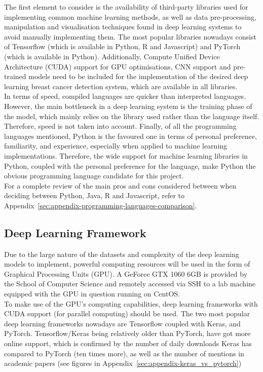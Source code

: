 The first element to consider is the availability of third-party libraries used for implementing common machine learning methods, as well as data pre-processing, manipulation and visualisation techniques found in deep learning systems to avoid manually implementing them. The most popular libraries nowadays consist of Tensorflow (which is available in Python, R and Javascript) and PyTorch (which is available in Python). Additionally, Compute Unified Device Architecture (CUDA) support for GPU optimisations, CNN support and pre-trained models need to be included for the implementation of the desired deep learning breast cancer detection system, which are available in all libraries.\\

In terms of speed, compiled languages are quicker than interpreted languages. However, the main bottleneck in a deep learning system is the training phase of the model, which mainly relies on the library used rather than the language itself. Therefore, speed is not taken into account. Finally, of all the programming languages mentioned, Python is the favoured one in terms of personal preference, familiarity, and experience, especially when applied to machine learning implementations. Therefore, the wide support for machine learning libraries in Python, coupled with the personal preference for the language, make Python the obvious programming language candidate for this project.\\

For a complete review of the main pros and cons considered between when deciding between Python, Java, R and Javascript, refer to Appendix~\ref{sec:appendix-programming-languages-comparison}.

\subsection{Deep Learning Framework}

Due to the large nature of the datasets and complexity of the deep learning models to implement, powerful computing resources will be used in the form of Graphical Processing Units (GPU). A GeForce GTX 1060 6GB is provided by the School of Computer Science and remotely accessed via SSH to a lab machine equipped with the GPU in question running on CentOS.\\

To make use of the GPU's computing capabilities, deep learning frameworks with CUDA support (for parallel computing) should be used. The two most popular deep learning frameworks nowadays are Tensorflow coupled with Keras, and PyTorch. Tensorflow/Keras being relatively older than PyTorch, have got more online support, which is confirmed by the number of daily downloads Keras has compared to PyTorch (ten times more), as well as the number of mentions in academic papers (see figures  in Appendix~\ref{sec:appendix-keras_vs_pytorch})

